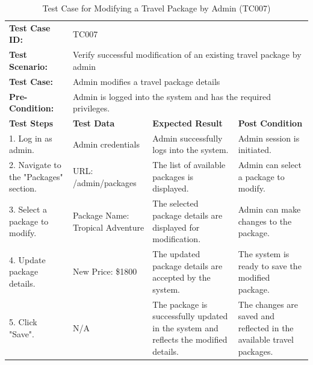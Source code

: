 \documentclass{scrreprt}
\begin{document}
    \begin{longtable}{| m{2cm} | m{5cm} | m{4cm} | m{3cm} |}
    \caption{Test Case for Modifying a Travel Package by Admin (TC007)}
    \vspace{0.5cm} \\ \hline
    \textbf{Test Case ID:} & \multicolumn{3}{l|}{TC007} \\ \hline
    \textbf{Test Scenario:} & \multicolumn{3}{l|}{Verify successful modification of an existing travel package by admin} \\ \hline
    \textbf{Test Case:} & \multicolumn{3}{l|}{Admin modifies a travel package details} \\ \hline
    \textbf{Pre-Condition:} & \multicolumn{3}{l|}{Admin is logged into the system and has the required privileges.} \\ \hline
    \textbf{Test Steps} & \textbf{Test Data} & \textbf{Expected Result} & \textbf{Post Condition} \\ \hline
    1. Log in as admin. & Admin credentials & Admin successfully logs into the system. & Admin session is initiated. \\ \hline
    2. Navigate to the "Packages" section. & URL: /admin/packages & The list of available packages is displayed. & Admin can select a package to modify. \\ \hline
    3. Select a package to modify. & Package Name: Tropical Adventure & The selected package details are displayed for modification. & Admin can make changes to the package. \\ \hline
    4. Update package details. & New Price: \$1800 & The updated package details are accepted by the system. & The system is ready to save the modified package. \\ \hline
    5. Click "Save". & N/A & The package is successfully updated in the system and reflects the modified details. & The changes are saved and reflected in the available travel packages. \\ \hline
    \end{longtable}
    
    \vspace{1cm}
    
\end{document}
